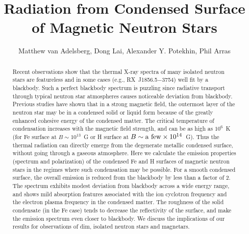 \documentclass{emulateapj}
\begin{document}
\title{Radiation from Condensed Surface of Magnetic Neutron Stars}

\author{Matthew van Adelsberg,
Dong Lai, 
Alexander Y. Potekhin,
Phil Arras}



\begin{abstract}
Recent observations show that the thermal X-ray spectra of many 
isolated neutron stars are featureless and in some cases (e.g.,
RX~J1856.5$-$3754) well fit by a blackbody. Such a perfect 
blackbody spectrum is puzzling since radiative transport through typical
neutron star atmospheres causes noticeable deviation from blackbody.  
Previous studies have shown that in a strong magnetic field, the outermost
layer of the neutron star may be in a condensed solid or liquid form
because of the greatly enhanced cohesive energy of the condensed matter.
The critical temperature of condensation 
increases with the magnetic field strength, and can be as high as 
$10^6$~K (for Fe surface at $B\sim 10^{13}$~G or H surface at
$B\sim {\rm a~few}\times 10^{14}$~G). Thus the thermal 
radiation can directly emerge from the degenerate metallic condensed surface,
without going through a gaseous atmosphere. Here
we calculate the emission properties (spectrum and polarization)
of the condensed Fe and H surfaces of magnetic neutron stars in the 
regimes where such condensation may be possible. 
For a smooth condensed surface, the overall emission is reduced from the 
blackbody by less than a factor of 2. The spectrum exhibits 
modest deviation from blackbody across a wide energy range, 
and shows mild absorption features associated with the ion 
cyclotron frequency and the electron plasma frequency in the condensed matter. 
The roughness of the solid condensate (in the Fe case) 
tends to decrease the reflectivity of the surface, and make the 
emission spectrum even closer to blackbody. We discuss the implications 
of our results for observations of dim, isolated neutron stars and magnetars.
\end{abstract}
\end{document}
